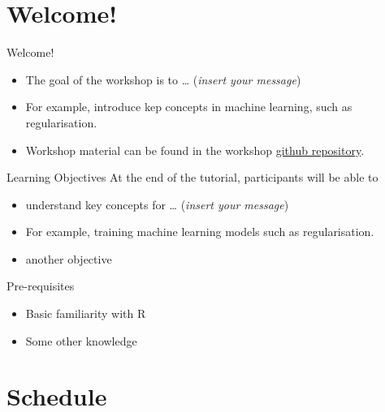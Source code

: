 \documentclass{beamer}
\begin{document}
\section{Welcome!}\label{welcome}

\begin{frame}{Welcome!}
\begin{itemize}[<+->]
\tightlist
\item
  The goal of the workshop is to \ldots{} (\emph{insert your message})
\item
  For example, introduce kep concepts in machine learning, such as
  regularisation.
\item
  Workshop material can be found in the workshop
  \href{https://github.com}{github repository}.
\end{itemize}

\begin{block}{Learning Objectives}
\label{learning-objectives}
At the end of the tutorial, participants will be able to

\begin{itemize}[<+->]
\tightlist
\item
  understand key concepts for \ldots{} (\emph{insert your message})
\item
  For example, training machine learning models such as regularisation.
\item
  another objective
\end{itemize}
\end{block}

\begin{block}{Pre-requisites}
\label{pre-requisites}
\begin{itemize}[<+->]
\tightlist
\item
  Basic familiarity with R
\item
  Some other knowledge
\end{itemize}
\end{block}
\end{frame}

\section{Schedule}\label{schedule}
\end{document}
